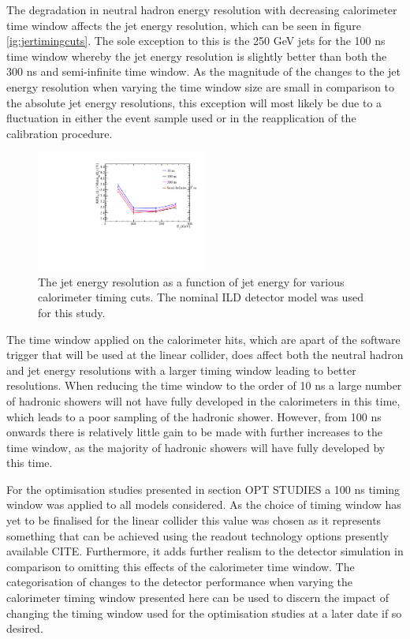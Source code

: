 The degradation in neutral hadron energy resolution with decreasing calorimeter time window affects the jet energy resolution, which can be seen in figure \ref{ig:jertimingcuts}.  The sole exception to this is the 250 GeV jets for the 100 ns time window whereby the jet energy resolution is slightly better than both the 300 ns and semi-infinite time window.  As the magnitude of the changes to the jet energy resolution when varying the time window size are small in comparison to the absolute jet energy resolutions, this exception will most likely be due to a fluctuation in either the event sample used or in the reapplication of the calibration procedure.  

\begin{figure}
\includegraphics[width=0.5\textwidth]{EnergyEstimators/Plots/TimingCuts/JER_vs_JetEnergy_TimingCutStudies.pdf}
\caption[The jet energy resolution as a function of jet energy for various calorimeter timing cuts.  The results shown use the nominal ILD detector model.]{The jet energy resolution as a function of jet energy for various calorimeter timing cuts.  The nominal ILD detector model was used for this study.}
\label{fig:jertimingcuts}
\end{figure}

The time window applied on the calorimeter hits, which are apart of the software trigger that will be used at the linear collider, does affect both the neutral hadron and jet energy resolutions with a larger timing window leading to better resolutions.  When reducing the time window to the order of 10 ns a large number of hadronic showers will not have fully developed in the calorimeters in this time, which leads to a poor sampling of the hadronic shower.  However, from 100 ns onwards there is relatively little gain to be made with further increases to the time window, as the majority of hadronic showers will have fully developed by this time.  

For the optimisation studies presented in section OPT STUDIES a 100 ns timing window was applied to all models considered.  As the choice of timing window has yet to be finalised for the linear collider this value was chosen as it represents something that can be achieved using the readout technology options presently available CITE.  Furthermore, it adds further realism to the detector simulation in comparison to omitting this effects of the calorimeter time window.  The categorisation of changes to the detector performance when varying the calorimeter timing window presented here can be used to discern the impact of changing the timing window used for the optimisation studies at a later date if so desired.  


